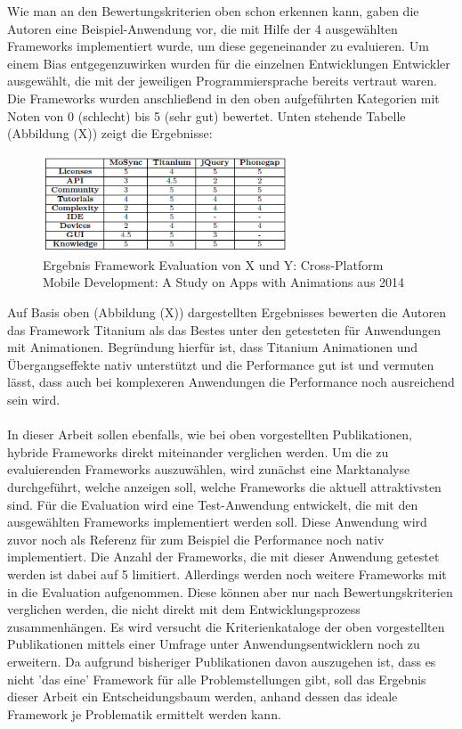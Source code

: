 Wie man an den Bewertungskriterien oben schon erkennen kann, gaben die Autoren eine Beispiel-Anwendung vor, die mit Hilfe der 4 ausgewählten Frameworks implementiert wurde, um diese gegeneinander zu evaluieren. Um einem Bias entgegenzuwirken wurden für die einzelnen Entwicklungen Entwickler ausgewählt, die mit der jeweiligen Programmiersprache bereits vertraut waren. Die Frameworks wurden anschließend in den oben aufgeführten Kategorien mit Noten von 0 (schlecht) bis 5 (sehr gut) bewertet. Unten stehende Tabelle (Abbildung (X)) zeigt die Ergebnisse:

 \begin{figure}[h]
	\centering
	\includegraphics[width=0.65\textwidth]{Bilder/Ergebnis_Framework_Bewertung_Publ_2.PNG}
	\caption{Ergebnis Framework Evaluation von X und Y: Cross-Platform Mobile Development: A Study on Apps with Animations aus 2014}
	\label{fig:Ergebnis_API_Test_Publ}
\end{figure}

Auf Basis oben (Abbildung (X)) dargestellten Ergebnisses bewerten die Autoren das Framework Titanium als das Bestes unter den getesteten für Anwendungen mit Animationen. Begründung hierfür ist, dass Titanium Animationen und Übergangseffekte nativ unterstützt und die Performance gut ist und vermuten lässt, dass auch bei komplexeren Anwendungen die Performance noch ausreichend sein wird. 
\\
\\
In dieser Arbeit sollen ebenfalls, wie bei oben vorgestellten Publikationen, hybride Frameworks direkt miteinander verglichen werden. Um die zu evaluierenden Frameworks auszuwählen, wird zunächst eine Marktanalyse durchgeführt, welche anzeigen soll, welche Frameworks die aktuell attraktivsten sind. Für die Evaluation wird eine Test-Anwendung entwickelt, die mit den ausgewählten Frameworks implementiert werden soll. Diese Anwendung wird zuvor noch als Referenz für zum Beispiel die Performance noch nativ implementiert. Die Anzahl der Frameworks, die mit dieser Anwendung getestet werden ist dabei auf 5 limitiert. Allerdings werden noch weitere Frameworks mit in die Evaluation aufgenommen. Diese können aber nur nach Bewertungskriterien verglichen werden, die nicht direkt mit dem Entwicklungsprozess zusammenhängen. Es wird versucht die Kriterienkataloge der oben vorgestellten Publikationen mittels einer Umfrage unter Anwendungsentwicklern noch zu erweitern. Da aufgrund bisheriger Publikationen davon auszugehen ist, dass es nicht 'das eine' Framework für alle Problemstellungen gibt, soll das Ergebnis dieser Arbeit ein Entscheidungsbaum werden, anhand dessen das ideale Framework je Problematik ermittelt werden kann. 

